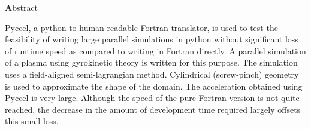 
\clearemptydoublepage
{}
{}

\vspace*{2cm}
\begin{center}
{\Large \textbf Abstract}
\end{center}
\vspace{1cm}

Pyccel, a python to human-readable Fortran translator, is used to test the feasibility of writing large parallel simulations in python without significant loss of runtime speed as compared to writing in Fortran directly. A parallel simulation of a plasma using gyrokinetic theory is written for this purpose. The simulation uses a field-aligned semi-lagrangian method. Cylindrical (screw-pinch) geometry is used to approximate the shape of the domain. The acceleration obtained using Pyccel is very large. Although the speed of the pure Fortran version is not quite reached, the decrease in the amount of development time required largely offsets this small loss.
